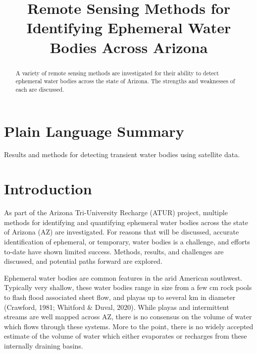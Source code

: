 \documentclass[
]{agujournal2019}
\begin{document}
\title{Remote Sensing Methods for Identifying Ephemeral Water Bodies
Across Arizona}



\begin{abstract}
A variety of remote sensing methods are investigated for their ability
to detect ephemeral water bodies across the state of Arizona. The
strengths and weaknesses of each are discussed.
\end{abstract}

\section*{Plain Language Summary}
Results and methods for detecting transient water bodies using satellite
data.




\section{Introduction}\label{introduction}

As part of the Arizona Tri-University Recharge (ATUR) project, multiple
methods for identifying and quantifying ephemeral water bodies across
the state of Arizona (AZ) are investigated. For reasons that will be
discussed, accurate identification of ephemeral, or temporary, water
bodies is a challenge, and efforts to-date have shown limited success.
Methods, results, and challenges are discussed, and potential paths
forward are explored.

Ephemeral water bodies are common features in the arid American
southwest. Typically very shallow, these water bodies range in size from
a few cm rock pools to flash flood associated sheet flow, and playas up
to several km in diameter (Crawford, 1981; Whitford \& Duval, 2020).
While playas and intermittent streams are well mapped across AZ, there
is no consensus on the volume of water which flows through these
systems. More to the point, there is no widely accepted estimate of the
volume of water which either evaporates or recharges from these
internally draining basins.
\end{document}
